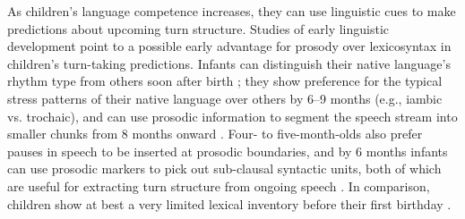\documentclass[authoryear, 12pt]{elsarticle}
\begin{document}
As children's language competence increases, they can use linguistic cues to make predictions about upcoming turn structure. Studies of early linguistic development point to a possible early advantage for prosody over lexicosyntax in children's turn-taking predictions. Infants can distinguish their native language's rhythm type from others soon after birth \citep{mehler1988, nazzi2003}; they show preference for the typical stress patterns of their native language over others by 6--9 months (e.g., iambic vs. trochaic), and can use prosodic information to segment the speech stream into smaller chunks from 8 months onward \citep{johnson2001, morgan1995}. Four- to five-month-olds also prefer pauses in speech to be inserted at prosodic boundaries, and by 6 months infants can use prosodic markers to pick out sub-clausal syntactic units, both of which are useful for extracting turn structure from ongoing speech \citep{jusczyk1995, soderstrom2003}. In comparison, children show at best a very limited lexical inventory before their first birthday \citep{bergelson2013, shi2010}.


\end{document}
